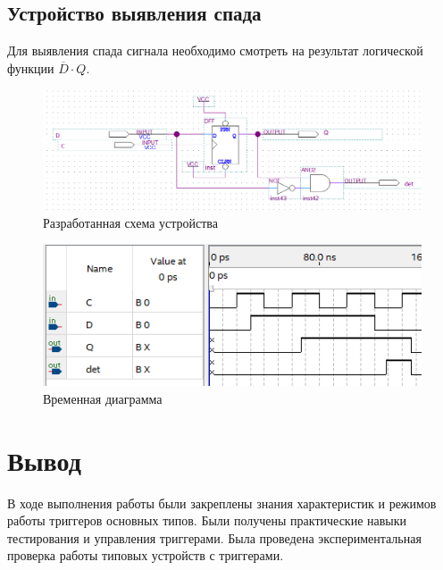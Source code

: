 \documentclass[a4paper,12pt]{article}
\begin{document}
    \subsection{Устройство выявления спада}
    Для выявления спада сигнала необходимо смотреть на результат логической функции $\overline{D} \cdot Q$.
    \begin{figure}[H]
		\centering
		\includegraphics[width=\linewidth]{polytech/scheme/report-lab3/subfiles/images/scheme-8}
		\caption{Разработанная схема устройства}
		\label{fig:scheme-8}
	\end{figure}
    \begin{figure}[H]
		\centering
		\includegraphics[width=\linewidth]{polytech/scheme/report-lab3/subfiles/images/wave-8}
		\caption{Временная диаграмма}
		\label{fig:wave-8}
	\end{figure}

    \section{Вывод}
    В ходе выполнения работы были закреплены знания характеристик и режимов работы триггеров основных типов.
    Были получены практические навыки тестирования и управления триггерами. Была проведена экспериментальная
    проверка работы типовых устройств с триггерами.
\end{document}
